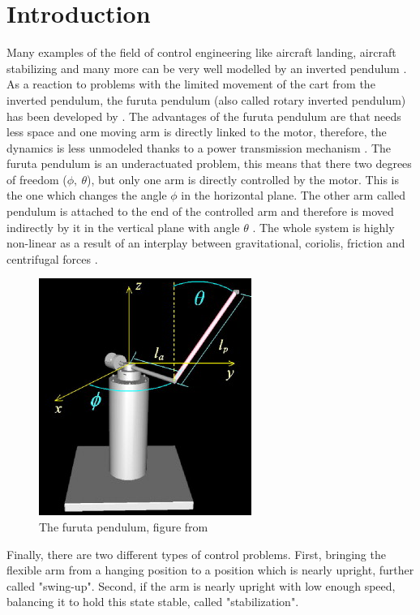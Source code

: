 \section{Introduction}
Many examples of the field of control engineering like aircraft landing, 
aircraft stabilizing and many more can be very well modelled by an inverted 
pendulum \cite{akhtaruzzaman2010modeling}. As a reaction to problems with the 
limited movement of the cart from 
the inverted pendulum, the furuta pendulum (also called rotary inverted 
pendulum) 
has been developed by 
\citeauthor{furuta1992swing}. The advantages of the furuta pendulum are that 
needs less space and one moving arm is directly linked to the motor, therefore, 
the dynamics is less unmodeled thanks to a power transmission mechanism 
\cite{furuta1992swing}. The furuta pendulum is an underactuated problem, this 
means that there two degrees of freedom ($\phi,\ \theta$), 
but only one arm is directly controlled by the motor. This is the one which 
changes the angle $\phi$ in the horizontal plane. The other arm called pendulum 
is attached to 
the end of the controlled arm and therefore is moved indirectly by it in the 
vertical plane with angle $\theta$ 
\cite{spong1998underactuated,tedrake2009underactuated}. The whole system is 
highly non-linear as a result of an interplay between gravitational, coriolis, 
friction and centrifugal forces \cite{izutsu2008swing}.
\begin{figure}[h]
	\centering
	\includegraphics[width=0.5\linewidth]{pendulum}
	\caption{The furuta pendulum, figure from \cite{la2009new}}
	\label{fig:pendulum}
\end{figure}
Finally, there are two different types of control problems. First, bringing the 
flexible arm from a hanging position to a position which is nearly upright, 
further called "swing-up". Second, if the arm is nearly upright with low enough 
speed, balancing it to hold this state stable, called "stabilization". 
